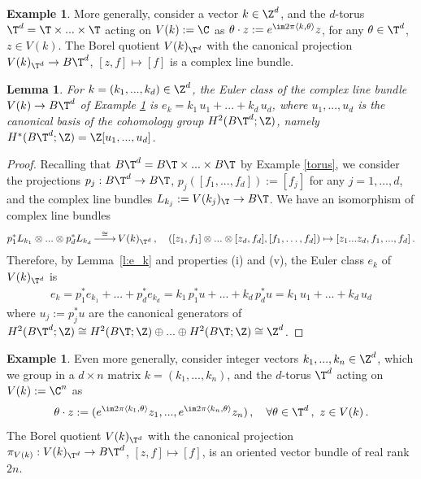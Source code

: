\documentclass[11pt,a4paper,reqno]{article}
\DeclareMathOperator*{\ttoup}{\llongrightarrow}
\DeclareRobustCommand{\llongrightarrow}{\relbar\joinrel\relbar\joinrel\rightarrow}
\numberwithin{equation}{section}
\newtheorem{lemma}[theorem]{Lemma}
\theoremstyle{definition}
\newtheorem{example}[theorem]{Example}
\begin{document}
\begin{example}
\label{es2}
More generally, consider a vector $k \in\Z^d$, and the $d$-torus $\T^d=\T\times...\times\T$ acting on $V(k):=\C$ as
$  \theta\cdot z:=e^{\im 2\pi \langle k,\theta\rangle }z $,
for any $  \theta\in \T^d $, $ z\in V(k) $. 
The Borel quotient $V(k)_{\T^d}$  with the canonical projection $ V(k)_{\T^d}\to B\T^d$, $[z,f]\mapsto [f]$ is a complex line bundle. 


\begin{lemma}\label{lemma214}
For $k=(k_1,...,k_d)\in\Z^d$, the Euler class of the complex line bundle $V(k)\to B\T^d$ of Example \ref{es2} is 
$ e_k=k_1\,u_1+...+k_d\,u_d $, where $u_1,...,u_d$ is the canonical basis of the cohomology group $H^2(B\T^d;\Z)$, namely
$ H^*(B\T^d;\Z)=\Z[u_1,...,u_d]
$. 
\end{lemma}


\begin{proof}
Recalling that $B\T^d=B\T\times...\times B\T$ by Example \ref{torus}, 
we consider the projections 
$  p_j:B\T^d\to B\T $, $ p_j([f_1,...,f_d]):=[f_j] $ for any $ j = 1, \ldots, d $,
and 
the complex line bundles 
$ L_{k_j}:=V(k_j)_\T\to B\T $. 
We have an isomorphism of complex line bundles
\begin{align*}
 p_1^*L_{k_1}\otimes...\otimes p_d^*L_{k_d}
 \ttoup^{\cong}
V(k)_{\T^d} \, ,\quad
 ([z_1,f_1]\otimes...\otimes[z_d,f_d], [f_1, \dots, f_d])
 \mapsto
 [z_1...z_d,f_1,...,f_d] \, .
\end{align*}
Therefore, by Lemma~\ref{l:e_k} and properties (i) and (v), the Euler class $e_k$ of $ V(k)_{\T^d} $ is 
\begin{align*}
 e_k
 =
 p_1^*e_{k_1}+...+p_d^*e_{k_d}
 =
 k_1\,p_1^*u+...+k_d\,p_d^*u =
 k_1\, u_1 +...+k_d\,u_d 
\end{align*}
where $u_j:=p_j^*u$  
are the canonical generators of 
$ H^2(B\T^d;\Z)\cong H^2(B\T;\Z)\oplus...\oplus H^2(B\T;\Z) \cong\Z^d $. 
\end{proof}
\end{example}


\begin{example}\label{ex:Vk}
Even more generally, consider  integer vectors $k_1,...,k_n\in\Z^d$, which we group in a $d\times n$ matrix $k=(k_1,...,k_n)$, 
and the $d$-torus $\T^d$ acting on $V(k):=\C^n$ as
\begin{align}\label{eq:def action k1...kn}
 \theta\cdot z:=(e^{ \im 2\pi \langle k_1,\theta\rangle }z_1,...,e^{ \im 2\pi \langle k_n,\theta\rangle }z_n) \, ,
 \quad 
 \forall \theta\in \T^d \, ,\ z\in V(k) \, .
\end{align}
The Borel quotient $V(k)_{\T^d}$  with the canonical projection $\pi_{V(k)}  : V(k)_{\T^d}\to B\T^d$, $[z,f]\mapsto [f]$, is an oriented vector bundle of real rank $2n$. 
\end{example}
\end{document}
